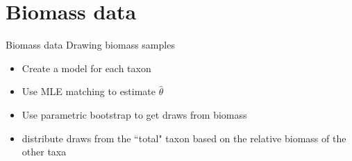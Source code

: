 \documentclass[12pt,t]{beamer}
\newcommand{\ig}{\includegraphics}
\newcommand{\subt}[1]{{\footnotesize \color{subtitle} {#1}}}
\begin{document}
\begin{comment}
\note{The biomass is observed at corner points within each grid cell. We'd like to estimate the underlying distribution of biomass. Observed biomass was exactly zero in some grid cells, and the smoothed model should accomodate that.}
\end{frame}


\begin{frame}{Simulation}
\subt{Results for MLE}

\begin{center}
\ig[width=0.6\textwidth]{../../figures/Nov-conference-call/sim-mle}
\end{center}

\note{The biomass is observed at corner points within each grid cell. We'd like to estimate the underlying distribution of biomass. Observed biomass was exactly zero in some grid cells, and the smoothed model should accomodate that.}
\end{frame}



\begin{frame}{Simulation}
\subt{Results for mean-variance matching}

\begin{center}
\ig[width=0.6\textwidth]{../../figures/Nov-conference-call/sim-mean-var}
\end{center}

\note{The biomass is observed at corner points within each grid cell. We'd like to estimate the underlying distribution of biomass. Observed biomass was exactly zero in some grid cells, and the smoothed model should accomodate that.}
\end{frame}
\end{comment}



\section{Biomass data}

\begin{frame}{Biomass data}
\subt{Drawing biomass samples}

\begin{itemize}
  \item Create a model for each taxon
  \item Use MLE matching to estimate $\hat{\theta}$
  \item Use parametric bootstrap to get draws from biomass
  \item distribute draws from the ``total" taxon based on the relative biomass of the other taxa
\end{itemize}

\end{frame}
\end{document}
